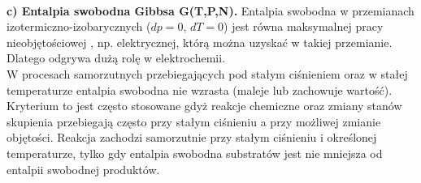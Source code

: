 \documentclass[12pt,a4paper,openright]{report} %
\begin{document}
\\
\textbf{c) Entalpia swobodna Gibbsa G(T,P,N).} Entalpia swobodna w przemianach izotermiczno-izobarycznych ($dp=0$, $dT=0$) jest równa maksymalnej pracy nieobjętościowej , np. elektrycznej, którą można uzyskać w takiej przemianie. Dlatego odgrywa dużą rolę w elektrochemii.\\
W procesach samorzutnych przebiegających pod stałym ciśnieniem oraz w stałej temperaturze entalpia swobodna nie wzrasta (maleje lub zachowuje wartość). Kryterium to jest często stosowane gdyż reakcje chemiczne oraz zmiany stanów skupienia przebiegają często przy stałym ciśnieniu a przy możliwej zmianie objętości. Reakcja zachodzi samorzutnie przy stałym ciśnieniu i określonej temperaturze, tylko gdy entalpia swobodna substratów jest nie mniejsza od entalpii swobodnej produktów.\\
\end{document}
